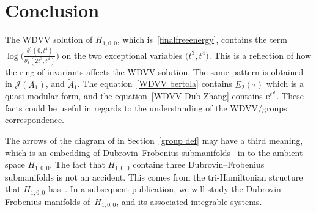 \documentclass[pdftex]{sigma}%
\numberwithin{equation}{section}
\newcommand{\Ja}{\mathcal{J}}
\begin{document}
\section{Conclusion}
The WDVV solution of $H_{1,0,0}$, which is~\eqref{finalfreeenergy}, contains the term $\log\big(\frac{\theta_1^{\prime}(0,t^4)}{\theta_1(2t^3,t^4)}\big)$ on the two exceptional variables $\big(t^3,t^4\big)$. This is a reflection of how the ring of invariants affects the WDVV solution. The same pattern is obtained in $\Ja(A_1)$, and $\tilde A_1$. The equation~\eqref{WDVV bertola} contains $E_2(\tau)$ which is a quasi modular form, and the equation~\eqref{WDVV Dub-Zhang} contains ${\rm e}^{t^2}$. These facts could be useful in regards to the understanding of the WDVV/groups correspondence.

The arrows of the diagram of in Section~\ref{group def} may have a third meaning, which is an embedding of Dubrovin--Frobenius submanifolds~\cite{Strachan1, Strachan2} in to the ambient space $H_{1,0,0}$. The fact that $H_{1,0,0}$ contains three Dubrovin--Frobenius submanifolds is not an accident. This comes from the tri-Hamiltonian structure that $H_{1,0,0}$ has~\cite{Pavlov2, Romano1}. In a subsequent publication, we will study the Dubrovin--Frobenius manifolds of~$H_{1,0,0}$, and its associated integrable systems.

\appendix
\end{document}
